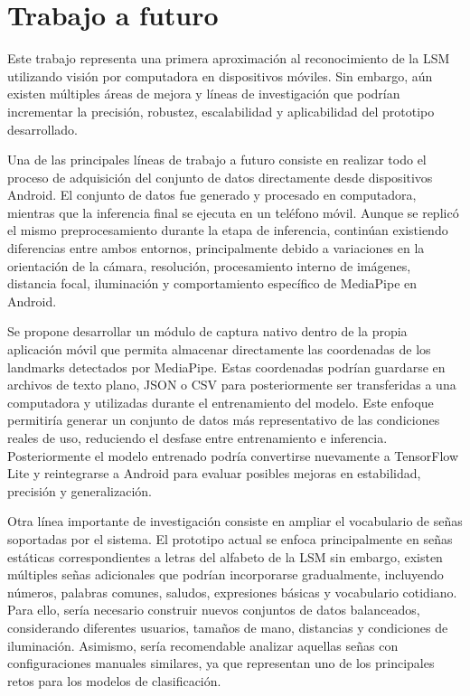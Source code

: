 	\chapter{Trabajo a futuro}
	
	Este trabajo representa una primera aproximación al reconocimiento de la LSM utilizando visión por computadora en dispositivos móviles. Sin embargo, aún existen múltiples áreas de mejora y líneas de investigación que podrían incrementar la precisión, robustez, escalabilidad y aplicabilidad del prototipo desarrollado.
	
	Una de las principales líneas de trabajo a futuro consiste en realizar todo el proceso de adquisición del conjunto de datos directamente desde dispositivos Android. El conjunto de datos fue generado y procesado en computadora, mientras que la inferencia final se ejecuta en un teléfono móvil. Aunque se replicó el mismo preprocesamiento durante la etapa de inferencia, continúan existiendo diferencias entre ambos entornos, principalmente debido a variaciones en la orientación de la cámara, resolución, procesamiento interno de imágenes, distancia focal, iluminación y comportamiento específico de MediaPipe en Android.
	
	Se propone desarrollar un módulo de captura nativo dentro de la propia aplicación móvil que permita almacenar directamente las coordenadas de los landmarks detectados por MediaPipe. Estas coordenadas podrían guardarse en archivos de texto plano, JSON o CSV para posteriormente ser transferidas a una computadora y utilizadas durante el entrenamiento del modelo. Este enfoque permitiría generar un conjunto de datos más representativo de las condiciones reales de uso, reduciendo el desfase entre entrenamiento e inferencia. Posteriormente el modelo entrenado podría convertirse nuevamente a TensorFlow Lite y reintegrarse a Android para evaluar posibles mejoras en estabilidad, precisión y generalización.
	
	Otra línea importante de investigación consiste en ampliar el vocabulario de señas soportadas por el sistema. El prototipo actual se enfoca principalmente en señas estáticas correspondientes a letras del alfabeto de la LSM sin embargo, existen múltiples señas adicionales que podrían incorporarse gradualmente, incluyendo números, palabras comunes, saludos, expresiones básicas y vocabulario cotidiano. Para ello, sería necesario construir nuevos conjuntos de datos balanceados, considerando diferentes usuarios, tamaños de mano, distancias y condiciones de iluminación. Asimismo, sería recomendable analizar aquellas señas con configuraciones manuales similares, ya que representan uno de los principales retos para los modelos de clasificación.
	
